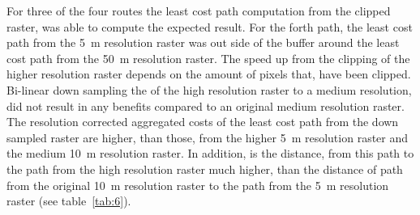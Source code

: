 For three of the four routes the least cost path computation from the clipped raster, was able to compute the expected result.
For the forth path, the
least cost path from the 5~m resolution raster was out side of the buffer around the least cost path from the 50~m resolution raster.
The speed up from the clipping of the higher resolution raster depends on the amount of pixels that, have been clipped. 
Bi-linear down sampling the of the high resolution raster to a medium resolution, did not result in any benefits compared to an original medium resolution raster.
The resolution corrected aggregated costs of the least cost path from the down sampled raster are higher, than those, from the higher 5~m resolution raster and the medium 10~m resolution raster.
In addition, is the distance, from this path to the path from the high resolution raster much higher, than the distance of path from the original 10~m resolution raster to the path from the 5~m resolution raster (see table~\ref{tab:6}).

